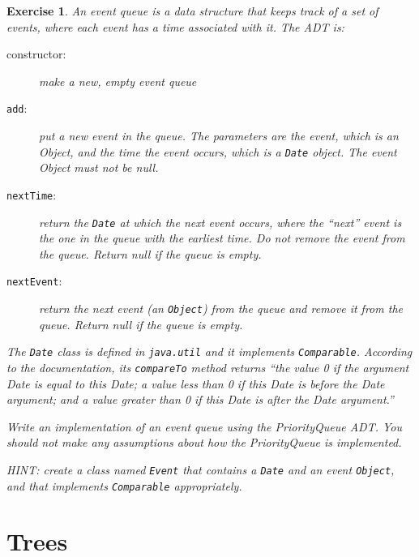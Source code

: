 \documentclass[12pt]{book}
\theoremstyle{exercise}
\newtheorem{exercise}{Exercise}[chapter]
\begin{document}
\begin{exercise}
An event queue is a data structure that keeps track of a set
of events, where each event has a time associated with it.
The ADT is:

\begin{description}

\item[constructor:] make a new, empty event queue

\item[{\tt add}:] put a new event in the queue.  The parameters are
the event, which is an Object, and the time the event occurs, which
is a {\tt Date} object.  The event Object must not be null.

\item[{\tt nextTime}:] return the {\tt Date} at which the next event
occurs, where the ``next'' event is the one in the queue with the
earliest time.  Do not remove the event from the queue.  Return
null if the queue is empty.

\item[{\tt nextEvent}:] return the next event (an {\tt Object}) from
the queue and remove it from the queue.  Return null if the queue is
empty.


\end{description}

The {\tt Date} class is defined in {\tt java.util} and it implements
{\tt Comparable}.  According to the documentation, its {\tt compareTo}
method returns ``the value 0 if the argument Date is equal to this
Date; a value less than 0 if this Date is before the Date argument;
and a value greater than 0 if this Date is after the Date argument.''

Write an implementation of an event queue using the PriorityQueue
ADT.  You should not make any assumptions about how the PriorityQueue
is implemented.

HINT: create a class named {\tt Event} that contains a {\tt Date}
and an event {\tt Object}, and that implements {\tt Comparable}
appropriately.
\end{exercise}



\chapter{Trees}
\end{document}
